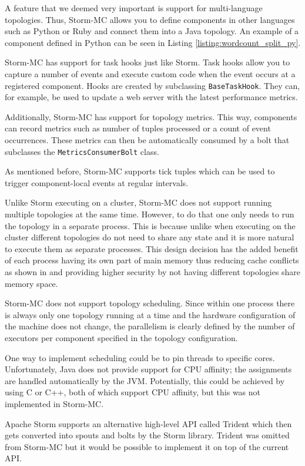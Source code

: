 \documentclass[bsc,logo,frontabs,twoside,singlespacing,normalheadings,parskip]{infthesis}\usepackage[]{graphicx}\usepackage[]{color}
\begin{document}
A feature that we deemed very important is support for multi-language topologies. Thus, Storm-MC allows you to define components in other languages such as Python or Ruby and connect them into a Java topology. An example of a component defined in Python can be seen in Listing \ref{listing:wordcount_split_py}.

Storm-MC has support for task hooks just like Storm. Task hooks allow you to capture a number of events and execute custom code when the event occurs at a registered component. Hooks are created by subclassing \texttt{BaseTaskHook}. They can, for example, be used to update a web server with the latest performance metrics.

Additionally, Storm-MC has support for topology metrics. This way, components can record metrics such as number of tuples processed or a count of event occurrences. These metrics can then be automatically consumed by a bolt that subclasses the \texttt{MetricsConsumerBolt} class.

As mentioned before, Storm-MC supports tick tuples which can be used  to trigger component-local events at regular intervals.

Unlike Storm executing on a cluster, Storm-MC does not support running multiple topologies at the same time. However, to do that one only needs to run the topology in a separate process. This is because unlike when executing on the cluster different topologies do not need to share any state and it is more natural to execute them as separate processes. This design decision has the added benefit of each process having its own part of main memory thus reducing cache conflicts as shown in \citep{Chandra:2005:PIC:1042442.1043432} and providing higher security by not having different topologies share memory space.

Storm-MC does not support topology scheduling. Since within one process there is always only one topology running at a time and the hardware configuration of the machine does not change, the parallelism is clearly defined by the number of executors per component specified in the topology configuration.

One way to implement scheduling could be to pin threads to specific cores. Unfortunately, Java does not provide support for CPU affinity; the assignments are handled automatically by the JVM. Potentially, this could be achieved by using C or C++, both of which support CPU affinity, but this was not implemented in Storm-MC.

Apache Storm supports an alternative high-level API called Trident which then gets converted into spouts and bolts by the Storm library. Trident was omitted from Storm-MC but it would be possible to implement it on top of the current API.
\end{document}
